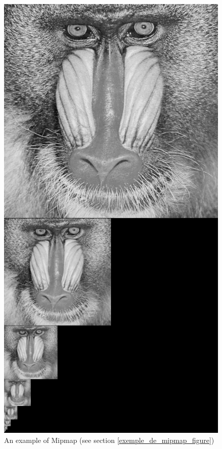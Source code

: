 
\label{exemple_de_mipmap_figure}
\begin{figure}[h!]
\centering
\includegraphics[scale=0.4]{MipMap_real} %
\caption{An example of Mipmap (see section \ref{exemple_de_mipmap_figure})}
\label{MipMap_real}
\end{figure}


